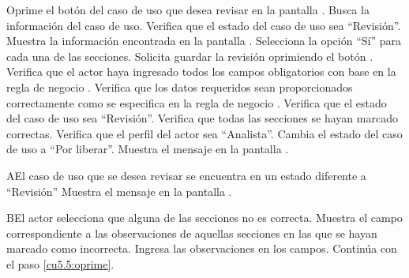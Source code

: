  \begin{UCtrayectoria}
	\UCpaso[\UCactor] Oprime el botón \btnRevisar del caso de uso que desea revisar en la pantalla .
    \UCpaso[\UCsist] Busca la información del caso de uso. 
    \UCpaso[\UCsist] Verifica que el estado del caso de uso sea ``Revisión''. 
    \UCpaso[\UCsist] Muestra la información encontrada en la pantalla .
    \UCpaso[\UCactor] Selecciona la opción ``Sí'' para cada una de las secciones.  \label{cu5.5:selecciona}
	\UCpaso[\UCactor] Solicita guardar la revisión oprimiendo el botón . \label{cu5.5:oprime}
	\UCpaso[\UCsist] Verifica que el actor haya ingresado todos los campos obligatorios con base en la regla de negocio . 
	\UCpaso[\UCsist] Verifica que los datos requeridos sean proporcionados correctamente como se especifica en la regla de negocio . 
    \UCpaso[\UCsist] Verifica que el estado del caso de uso sea ``Revisión''. 
    \UCpaso[\UCsist] Verifica que todas las secciones se hayan marcado correctas. 
    \UCpaso[\UCsist] Verifica que el perfil del actor sea ``Analista''. 
    \UCpaso[\UCsist] Cambia el estado del caso de uso a ``Por liberar''.
    \UCpaso[\UCsist] Muestra el mensaje  en la pantalla .
 \end{UCtrayectoria}
 
 \begin{UCtrayectoriaA}{A}{El caso de uso que se desea revisar se encuentra en un estado diferente a ``Revisión''}
    \UCpaso[\UCsist] Muestra el mensaje  en la pantalla .
 \end{UCtrayectoriaA} 
 
 \begin{UCtrayectoriaA}{B}{El actor selecciona que alguna de las secciones no es correcta.}
    \UCpaso[\UCsist] Muestra el campo correspondiente a las observaciones de aquellas secciones en las que se hayan marcado como incorrecta.
    \UCpaso[\UCactor] Ingresa las observaciones en los campos.
	\UCpaso[] Continúa con el paso \ref{cu5.5:oprime}.
 \end{UCtrayectoriaA}
 

